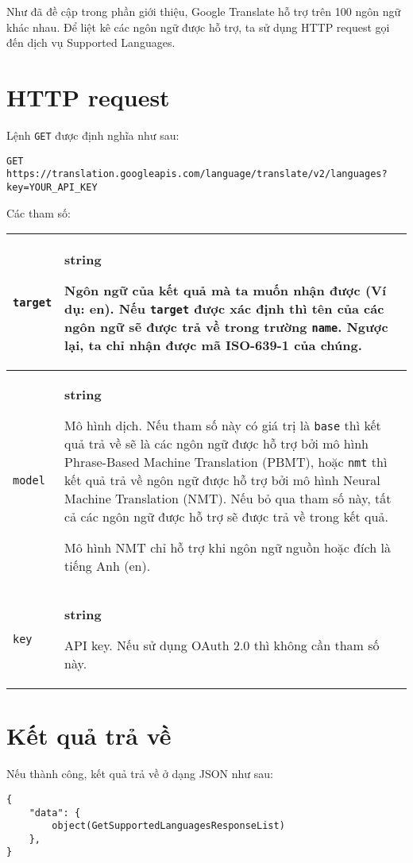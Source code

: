 \documentclass[../thesis.tex]{subfiles}
\begin{document}
Như đã đề cập trong phần giới thiệu, Google Translate hỗ trợ trên 100 ngôn ngữ khác nhau. Để liệt kê các ngôn ngữ được hỗ trợ, ta sử dụng HTTP request gọi đến dịch vụ Supported Languages.

\section{HTTP request}

Lệnh \lstinline{GET} được định nghĩa như sau:

\begin{lstlisting}[style=link]
GET https://translation.googleapis.com/language/translate/v2/languages?key=YOUR_API_KEY
\end{lstlisting}

Các tham số:

\begin{center}
\begin{tabularx}{\textwidth}{|p{}|X|}
\hline
\lstinline{target} & \textbf{string}

Ngôn ngữ của kết quả mà ta muốn nhận được (Ví dụ: en). Nếu \lstinline{target} được xác định thì tên của các ngôn ngữ sẽ được trả về trong trường \lstinline{name}. Ngược lại, ta chỉ nhận được mã ISO-639-1 của chúng.\\
\hline
\lstinline{model} & \textbf{string}

Mô hình dịch. Nếu tham số này có giá trị là \lstinline{base} thì kết quả trả về sẽ là các ngôn ngữ được hỗ trợ bởi mô hình Phrase-Based Machine Translation (PBMT), hoặc \lstinline{nmt} thì kết quả trả về ngôn ngữ được hỗ trợ bởi mô hình Neural Machine Translation (NMT). Nếu bỏ qua tham số này, tất cả các ngôn ngữ được hỗ trợ sẽ được trả về trong kết quả.

Mô hình NMT chỉ hỗ trợ khi ngôn ngữ nguồn hoặc đích là tiếng Anh (en).\\
\hline
\lstinline{key} & \textbf{string}

API key. Nếu sử dụng OAuth 2.0 thì không cần tham số này.\\
\hline
\end{tabularx}
\end{center}

\section{Kết quả trả về}
Nếu thành công, kết quả trả về ở dạng JSON như sau:
\begin{lstlisting}[style=link]
{
	"data": {
		object(GetSupportedLanguagesResponseList)
	},
}
\end{lstlisting}
\end{document}
